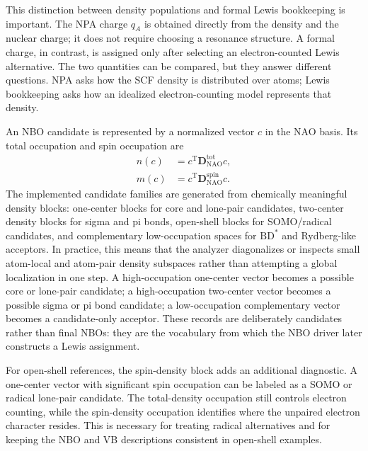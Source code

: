 \documentclass[11pt]{article}
\newcommand{\nao}{\mathrm{NAO}}
\newcommand{\dens}{\mathbf{D}}
\begin{document}
This distinction between density populations and formal Lewis bookkeeping is important.  The NPA charge $q_A$ is obtained directly from the density and the nuclear charge; it does not require choosing a resonance structure.  A formal charge, in contrast, is assigned only after selecting an electron-counted Lewis alternative.  The two quantities can be compared, but they answer different questions.  NPA asks how the SCF density is distributed over atoms; Lewis bookkeeping asks how an idealized electron-counting model represents that density.

An NBO candidate is represented by a normalized vector $c$ in the NAO basis.  Its total occupation and spin occupation are
\begin{equation}
\begin{aligned}
	n(c) &= c^{\mathrm{T}}\dens^{\mathrm{tot}}_{\nao}c, \\
	m(c) &= c^{\mathrm{T}}\dens^{\mathrm{spin}}_{\nao}c.
\end{aligned}
\end{equation}
The implemented candidate families are generated from chemically meaningful density blocks: one-center blocks for core and lone-pair candidates, two-center density blocks for sigma and pi bonds, open-shell blocks for SOMO/radical candidates, and complementary low-occupation spaces for $\mathrm{BD}^{\ast}$ and Rydberg-like acceptors.  In practice, this means that the analyzer diagonalizes or inspects small atom-local and atom-pair density subspaces rather than attempting a global localization in one step.  A high-occupation one-center vector becomes a possible core or lone-pair candidate; a high-occupation two-center vector becomes a possible sigma or pi bond candidate; a low-occupation complementary vector becomes a candidate-only acceptor.  These records are deliberately candidates rather than final NBOs: they are the vocabulary from which the NBO driver later constructs a Lewis assignment.

For open-shell references, the spin-density block adds an additional diagnostic.  A one-center vector with significant spin occupation can be labeled as a SOMO or radical lone-pair candidate.  The total-density occupation still controls electron counting, while the spin-density occupation identifies where the unpaired electron character resides.  This is necessary for treating radical alternatives and for keeping the NBO and VB descriptions consistent in open-shell examples.
\end{document}
